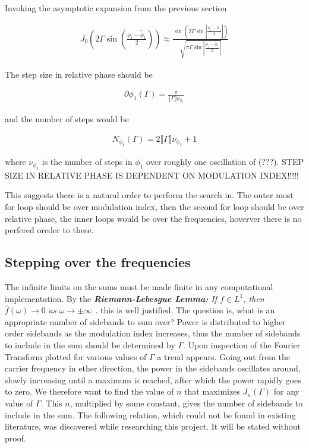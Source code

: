 \documentclass[onecolumn, groupedaddress, 10pt]{revtex4-1}
\begin{document}
Invoking the asymptotic expansion from the previous section

\begin{align}
J_0 \left( 2\Gamma \sin \left( \frac{\phi_1-\widetilde{\phi}_1}{2} \right) \right) 
\approx
\frac{
\sin \left( 2\Gamma \sin \left| \frac{\phi_1-\widetilde{\phi}_1}{2} \right| \right)
}{
\sqrt{\pi \Gamma \sin \left| \frac{\phi_1-\widetilde{\phi}_1}{2} \right|}}
\end{align}


The step size in relative phase should be

\begin{align}
\boxed{
\partial \phi_1 (\Gamma) = \frac{\pi}{ \llbracket \Gamma \rrbracket \nu_{\phi_1}}
}
\end{align}

and the number of steps would be

\begin{align}
\boxed{
N_{\phi_1} (\Gamma) = 2 \llbracket \Gamma \rrbracket \nu_{\phi_1} + 1
}
\end{align}

where $\nu_{\phi_1}$ is the number of steps in $\phi_1$ over roughly one oscillation of (???).  STEP SIZE IN RELATIVE PHASE IS DEPENDENT ON MODULATION INDEX!!!!!

This suggests there is a natural order to perform the search in.  The outer most for loop should be over modulation index, then the second for loop should be over relative phase, the inner loops would be over the frequencies, hoverver there is no perfered oreder to these.


\subsection{Stepping over the frequencies}
The infinite limits on the sums must be made finite in any computational implementation.  By the \textit{\textbf{Riemann-Lebesgue Lemma:} If $f\in L^1$, then $\hat{f}(\omega)\to 0$ as $\omega \to \pm \infty$ \citep[P.217]{folland}.} this is well justified.  The question is, what is an appropriate number of sidebands to sum over?  Power is distributed to higher order sidebands as the modulation index increases, thus the number of sidebands to include in the sum should be determined by $\Gamma$.  Upon inspection of the Fourier Transform plotted for various values of $\Gamma$ a trend appears.  Going out from the carrier frequency in ether direction, the power in the sidebands oscillates around, slowly increasing until a maximum is reached, after which the power rapidly goes to zero.  We therefore want to find the value of $n$ that maximizes $J_n(\Gamma)$ for any value of $\Gamma$.  This $n$, multiplied by some constant, gives the number of sidebands to include in the sum.  The following relation, which could not be found in existing literature, was discovered while researching this project.  It will be stated without proof.
\end{document}
